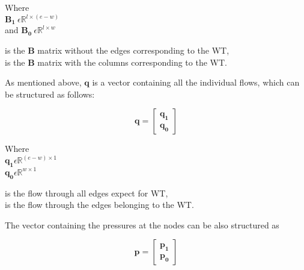 \begin{minipage}[t]{0.18\textwidth}
Where\\
\hspace*{8mm} $\pmb{B_1} \: \epsilon \mathbb{R}^{l \times (e-w)}$  \\
and \hspace*{0.4mm} $\pmb{B_0} \: \epsilon \mathbb{R}^{l \times w} $ 
\end{minipage}
\begin{minipage}[t]{0.70\textwidth}
\vspace*{2mm}
\hspace*{4mm} is the $\pmb{B}$ matrix without the edges corresponding to the WT,\\
\hspace*{4mm} is the $\pmb{B}$ matrix with the columns corresponding to the WT.
\end{minipage}

As mentioned above, $\pmb{q}$ is a vector containing all the individual flows, which can be structured as follows:

\begin{equation}
\pmb{q} =
\begin{bmatrix}
         \pmb{q_1} \\
	\pmb{q_0} 
\end{bmatrix}
\label{qmatrix}
\end{equation}

\begin{minipage}[t]{0.20\textwidth}
Where\\
\hspace*{8mm} $\pmb{q_1} \epsilon \mathbb{R}^{(e-w) \times 1}$  \\
\hspace*{8mm} $\pmb{q_0} \epsilon \mathbb{R}^{w \times 1} $ 
\end{minipage}
\begin{minipage}[t]{0.68\textwidth}
\vspace*{2mm}
\hspace*{4mm} is the flow through all edges expect for WT,\\
\hspace*{4mm} is the flow through the edges belonging to the WT. 
\end{minipage}

The vector containing the pressures at the nodes can be also structured as

\begin{equation}
\pmb{p} =
\begin{bmatrix}
         \pmb{p_1} \\
	\pmb{p_0} 
\end{bmatrix}
\end{equation}


